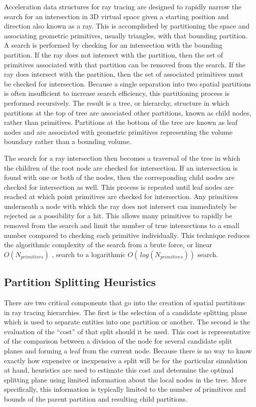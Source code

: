 Acceleration data structures for ray tracing are designed to rapidly narrow the
search for an intersection in 3D virtual space given a starting position and
direction also known as a ray. This is accomplished by partitioning the space
and associating geometric primitives, usually triangles, with that bounding
partition. A search is performed by checking for an intersection with the
bounding partition. If the ray does not intersect with the partition, then the
set of primitives associated with that partition can be removed from the
search. If the ray does intersect with the partition, then the set of associated
primitives must be checked for intersection. Because a single separation into
two spatial partitions is often insufficient to increase search efficiency, this
partitioning process is performed recursively. The result is a tree, or
hierarchy, structure in which partitions at the top of tree are associated other
partitions, known as child nodes, rather than primitives. Partitions at the
bottom of the tree are known as leaf nodes and are associated with geometric
primitives representing the volume boundary rather than a bounding volume.

The search for a ray intersection then becomes a traversal of the tree in which
the children of the root node are checked for intersection. If an intersection
is found with one or both of the nodes, then the corresponding child nodes are
checked for intersection as well. This process is repeated until leaf nodes are
reached at which point primitives are checked for intersection. Any primitives
underneath a node with which the ray does not intersect can immediately be
rejected as a possibility for a hit. This allows many primitives to rapidly be
removed from the search and limit the number of true intersections to a small
number compared to checking each primitive individually. This technique reduces
the algorithmic complexity of the search from a brute force, or linear
$O(N_{primitives})$ , search to a logarithmic $O(\, log(N_{primitives}))$
search.

\subsection{Partition Splitting Heuristics}

There are two critical components that go into the creation of spatial
partitions in ray tracing hierarchies. The first is the selection of a candidate
splitting plane which is used to separate entities into one partition or
another. The second is the evaluation of the ``cost'' of that split should it be
used. This cost is representative of the comparison between a division of the
node for several candidate split planes and forming a leaf from the current
node.  Because there is no way to know exactly how expensive or inexpensive a
split will be for the particular simulation at hand, heuristics are used to
estimate this cost and determine the optimal splitting plane using limited
information about the local nodes in the tree. More specifically, this
information is typically limited to the number of primitives and bounds of the
parent partition and resulting child partitions.


